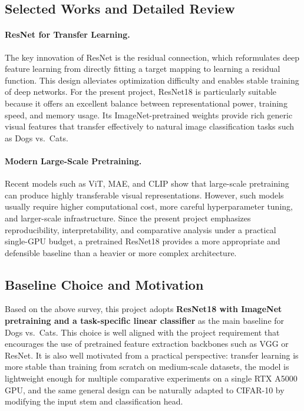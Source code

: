 \documentclass[11pt,a4paper]{article}
\begin{document}
\subsection{Selected Works and Detailed Review}
\paragraph{ResNet for Transfer Learning.}
The key innovation of ResNet is the residual connection, which reformulates deep feature learning from directly fitting a target mapping to learning a residual function. This design alleviates optimization difficulty and enables stable training of deep networks. For the present project, ResNet18 is particularly suitable because it offers an excellent balance between representational power, training speed, and memory usage. Its ImageNet-pretrained weights provide rich generic visual features that transfer effectively to natural image classification tasks such as Dogs vs.\ Cats.

\paragraph{Modern Large-Scale Pretraining.}
Recent models such as ViT, MAE, and CLIP show that large-scale pretraining can produce highly transferable visual representations. However, such models usually require higher computational cost, more careful hyperparameter tuning, and larger-scale infrastructure. Since the present project emphasizes reproducibility, interpretability, and comparative analysis under a practical single-GPU budget, a pretrained ResNet18 provides a more appropriate and defensible baseline than a heavier or more complex architecture.

\subsection{Baseline Choice and Motivation}
Based on the above survey, this project adopts \textbf{ResNet18 with ImageNet pretraining and a task-specific linear classifier} as the main baseline for Dogs vs.\ Cats. This choice is well aligned with the project requirement that encourages the use of pretrained feature extraction backbones such as VGG or ResNet. It is also well motivated from a practical perspective: transfer learning is more stable than training from scratch on medium-scale datasets, the model is lightweight enough for multiple comparative experiments on a single RTX A5000 GPU, and the same general design can be naturally adapted to CIFAR-10 by modifying the input stem and classification head.
\end{document}
